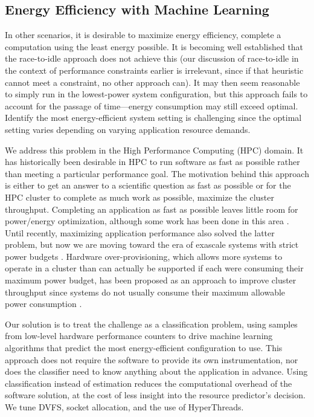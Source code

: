 \subsection{Energy Efficiency with Machine Learning}

In other scenarios, it is desirable to maximize energy efficiency, \ie complete a computation using the least energy possible.
It is becoming well established that the race-to-idle approach does not achieve this (our discussion of race-to-idle in the context of performance constraints earlier is irrelevant, since if that heuristic cannot meet a constraint, no other approach can).
It may then seem reasonable to simply run in the lowest-power system configuration, but this approach fails to account for the passage of time---energy consumption may still exceed optimal.
Identify the most energy-efficient system setting is challenging since the optimal setting varies depending on varying application resource demands.

We address this problem in the High Performance Computing (HPC) domain.
It has historically been desirable in HPC to run software as fast as possible rather than meeting a particular performance goal.
The motivation behind this approach is either to get an answer to a scientific question as fast as possible or for the HPC cluster to complete as much work as possible, \ie maximize the cluster throughput.
Completing an application as fast as possible leaves little room for power/energy optimization, although some work has been done in this area \cite{TODO}.
Until recently, maximizing application performance also solved the latter problem, but now we are moving toward the era of exascale systems with strict power budgets \cite{Exascale20MW}.
Hardware over-provisioning, which allows more systems to operate in a cluster than can actually be supported if each were consuming their maximum power budget, has been proposed as an approach to improve cluster throughput since systems do not usually consume their maximum allowable power consumption \cite{PatkiRMAP}.

Our solution is to treat the challenge as a classification problem, using samples from low-level hardware performance counters to drive machine learning algorithms that predict the most energy-efficient configuration to use.
This approach does not require the software to provide its own instrumentation, nor does the classifier need to know anything about the application in advance.
Using classification instead of estimation reduces the computational overhead of the software solution, at the cost of less insight into the resource predictor's decision.
We tune DVFS, socket allocation, and the use of HyperThreads.

